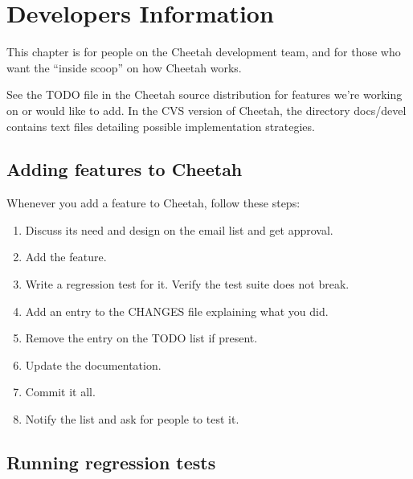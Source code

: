 \section{Developers Information}
\label{developer}

This chapter is for people on the Cheetah development team, and for those who
want the ``inside scoop'' on how Cheetah works.

See the TODO file in the Cheetah source distribution for features we're
working on or would like to add.  In the CVS version of Cheetah, the directory
docs/devel contains text files detailing possible implementation strategies.

\subsection{Adding features to Cheetah}

Whenever you add a feature to Cheetah, follow these steps:

\begin{enumerate}

\item  Discuss its need and design on the email list and get approval.

\item  Add the feature.

\item  Write a regression test for it.  Verify the test suite does not break.

\item  Add an entry to the CHANGES file explaining what you did.

\item  Remove the entry on the TODO list if present.

\item  Update the documentation.

\item  Commit it all.

\item  Notify the list and ask for people to test it.

\end{enumerate}


\subsection{Running regression tests}


